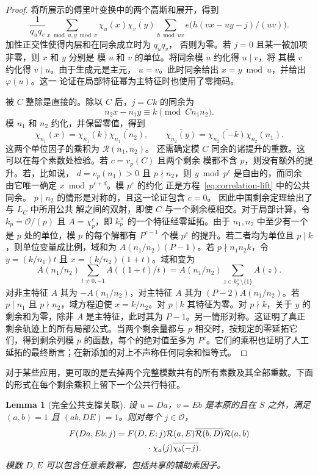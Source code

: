 \documentclass[11pt,a4paper]{article}
\numberwithin{equation}{section}
\numberwithin{figure}{section}
\newtheorem{lemma}[theorem]{Lemma}
\theoremstyle{definition}
\theoremstyle{remark}
\begin{document}
\begin{proof}
将所展示的傅里叶变换中的两个高斯和展开，得到
\[
 \frac1{q_uq_v}\sum_{x\bmod u,y\bmod v}\chi_u(x)\overline{\chi_v(y)}
 \sum_{h\bmod uv}e\bigl(h(vx-uy-j)/(uv)\bigr).
\]
加性正交性使得内层和在同余成立时为 $q_uq_v$，
否则为零。若 $j=0$ 且某一被加项非零，则 $x$ 和 $y$ 分别是
模 $u$ 和 $v$ 的单位。将同余模 $u$ 约化得 $u\mid v$，将
其模 $v$ 约化得 $v\mid u$。由于生成元是主元，
$u=v$。此时同余给出 $x=y\bmod u$，并给出 $\varphi(u)$。这一
论证在局部特征幂为主特征时也使用了零掩码。

被 $C$ 整除是直接的。除以 $C$ 后，$j=Ck$ 的同余为
\[
 n_2x-n_1y\equiv k\pmod{Cn_1n_2}.
\]
模 $n_1$ 和 $n_2$ 约化，并保留零值，得到
\[
 \chi_{n_1}(x)=\chi_{n_1}(k)\overline{\chi_{n_1}(n_2)},\qquad
 \overline{\chi_{n_2}(y)}
 =\overline{\chi_{n_2}(-k)}\chi_{n_2}(n_1).
\]
这两个单位因子的乘积为 $\mathcal R(n_1,n_2)$。
还需确定模 $C$ 同余的诸提升的重数。这可以在每个素数处检验。若 $c=v_p(C)$ 且两个剩余
模都不含 $p$，则没有额外的提升。若，比如说，
$d=v_p(n_1)>0$ 且 $p\nmid n_2$，则 $y\bmod p^c$ 是自由的，而同余
由它唯一确定 $x\bmod p^{c+d}$。模 $p^c$ 的约化
正是方程~\eqref{eq:correlation-lift} 中的公共同余。
$p\mid n_2$ 的情形是对称的，且这一论证包含 $c=0$。
因此中国剩余定理给出了与 $L_C$ 中所用公共
解之间的双射，即使 $C$ 与一个剩余模相交。对于局部计算，令 $k_p=\mathcal O/(p)$ 且 $A=\chi_p^c$，即 $k_p^\times$ 的一个特征经零延拓。由于 $n_1,n_2$ 中至少有一个是 $p$ 处的单位，模 $p$ 的每个解都有 $P^{c-1}$ 个模 $p^c$ 的提升。若二者均为单位且 $p\mid k$，则单位变量成比例，域和为 $A(n_1/n_2)(P-1)$。若 $p\nmid n_1n_2k$，令 $y=(k/n_1)t$ 且 $x=(k/n_2)(1+t)$。域和变为
\[
 A(n_1/n_2)\sum_{t\ne0,-1}A((1+t)/t)
 =A(n_1/n_2)\sum_{z\in k_p^\times\setminus\{1\}}A(z).
\]
对非主特征 $A$ 其为 $-A(n_1/n_2)$，对主特征 $A$ 其为 $(P-2)A(n_1/n_2)$。若 $p\mid n_1$ 且 $p\nmid n_2$，域方程迫使 $x=k/n_2$。对 $p\mid k$ 其特征为零。对 $p\nmid k$，关于 $y$ 的剩余和为零，除非 $A$ 是主特征，此时其为 $P-1$。另一情形对称。这证明了真正剩余轨迹上的所有局部公式。当两个剩余量都与 $p$ 相交时，按规定的零延拓它们，得到剩余列模 $p$ 的函数，每个的绝对值至多为 $P^c$。它们的乘积也证明了人工延拓的最终断言；在新添加的对上不声称任何同余和恒等式。
\end{proof}

对于某些应用，更可取的是去掉两个完整模数共有的所有素数及其全部重数。下面的形式在每个剩余乘积上留下一个公共行特征。

\begin{lemma}[完全公共支撑关联]
\label{lem:complete-support-correlation}
设 $u=Da$，$v=Eb$ 是本原的且在 $S$ 之外，满足 $(a,b)=1$ 且 $(ab,DE)=1$。则对每个 $j\in\mathcal O$，
\begin{equation}
 \begin{split}
 F(Da,Eb;j)={}&F(D,E;j)\mathcal R(a,E)
       \overline{\mathcal R(b,D)}\mathcal R(a,b)\\
 &\hspace{8mm}\cdot\chi_a(j)\overline{\chi_b(-j)}.
 \end{split}
 \label{eq:correlation-child-character}
\end{equation}
模数 $D,E$ 可以包含任意素数幂，包括共享的辅助素因子。
\end{lemma}
\end{document}
